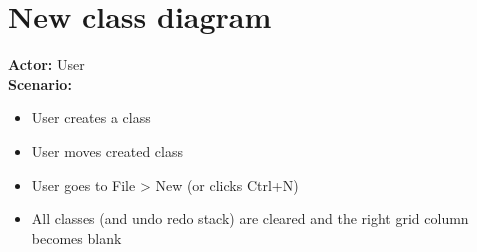 \section{New class diagram}
\textbf{Actor:} User\\
\textbf{Scenario:}
\begin{itemize}
\item User creates a class
\item User moves created class
\item User goes to File > New (or clicks Ctrl+N)
\item All classes (and undo redo stack) are cleared and the right grid column becomes blank
\end{itemize}